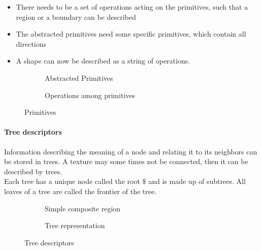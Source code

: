 \begin{itemize}
\item There needs to be a set of
operations acting on the
primitives, such that a region or a
boundary can be described
\item The abstracted primitives need
some specific primitives, which
contain all directions
\item A shape can now be described as a string of operations.
\end{itemize}
\begin{figure}[h]
	\centering
	\begin{subfigure}[b]{0.45\textwidth}
		\centering
		\caption{Abstracted Primitives}
	\end{subfigure}
	\begin{subfigure}[b]{0.45\textwidth}
		\centering
		\caption{Operations among primitives}
	\end{subfigure}
	\caption{Primitives}
\end{figure}

\paragraph{Tree descriptors}
Information describing the meaning of a node and relating it to its neighbors can be stored in trees.
A texture may some times not be connected, then it can be described by trees. \\

Each tree has a unique node called the root $\$$ and is made up of subtrees. All leaves of a tree are called the frontier of the tree.

\begin{figure}[h]
	\centering
	\begin{subfigure}[b]{0.45\textwidth}
		\centering
		\caption{Simple composite region}
	\end{subfigure}
	\begin{subfigure}[b]{0.45\textwidth}
		\centering
		\caption{Tree representation}
	\end{subfigure}
	\caption{Tree descriptors}
\end{figure}
